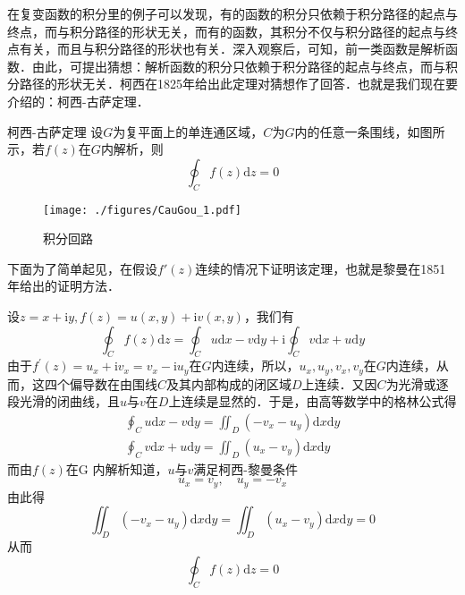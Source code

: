 

在复变函数的积分里的例子可以发现，有的函数的积分只依赖于积分路径的起点与终点，而与积分路径的形状无关，而有的函数，其积分不仅与积分路径的起点与终点有关，而且与积分路径的形状也有关．深入观察后，可知，前一类函数是解析函数．由此，可提出猜想：解析函数的积分只依赖于积分路径的起点与终点，而与积分路径的形状无关．柯西在1825年给出此定理对猜想作了回答．也就是我们现在要介绍的：柯西-古萨定理．


\begin{theorem}{柯西-古萨定理}
设$G $为复平面上的单连通区域，$C $为$G $内的任意一条围线，如图所示，若$f (z)$在$G $内解析，则
\begin{equation}
\oint_{C} f(z) \mathrm{d} z=0
\end{equation}
\begin{figure}[ht]
\centering
\texttt{[image: ./figures/CauGou\_1.pdf]}
\caption{积分回路} \label{CauGou_fig1}
\end{figure}

下面为了简单起见，在假设$f'(z)$连续的情况下证明该定理，也就是黎曼在1851年给出的证明方法．

设$z=x+\mathrm{i} y, f(z)=u(x, y)+\mathrm{i} v(x, y)$，我们有
\begin{equation}
\oint_{C} f(z) \mathrm{d} z=\oint_{C} u \mathrm{d} x-v \mathrm{d} y+\mathrm{i} \oint_{C} v \mathrm{d} x+u \mathrm{d} y
\end{equation}
由于$f^{\prime}(z)=u_{x}+\mathrm{i} v_{x}=v_{x}-\mathrm{i} u_{y}$在$G $内连续，所以，$u_{x}, u_{y}, v_{x}, v_{y}$在$G $内连续，从而，这四个偏导数在由围线$C$及其内部构成的闭区域$D $上连续．又因$C $为光滑或逐段光滑的闭曲线，且$u $与$v $在$D $上连续是显然的．于是，由高等数学中的格林公式得
\begin{equation}
\begin{aligned}\oint_C u \mathrm{d} x-v \mathrm{d} y=\iint_{D}\left(-v_{x}-u_{y}\right) \mathrm{d} x \mathrm{d} y \\ \oint_C v \mathrm{d} x+u \mathrm{d} y=\iint_{D}\left(u_{x}-v_{y}\right) \mathrm{d} x \mathrm{d} y\end{aligned}
\end{equation}
而由$ f (z)$在G 内解析知道，$u$与$v$满足柯西-黎曼条件
\begin{equation}
u_{x}=v_{y}, \quad u_{y}=-v_{x}
\end{equation}
由此得
\begin{equation}
\iint_{D}\left(-v_{x}-u_{y}\right) \mathrm{d} x \mathrm{d} y=\iint_{D}\left(u_{x}-v_{y}\right) \mathrm{d} x \mathrm{d} y=0
\end{equation}
从而
\begin{equation}
\oint_{C} f(z) \mathrm{d} z=0
\end{equation}
\end{theorem}

